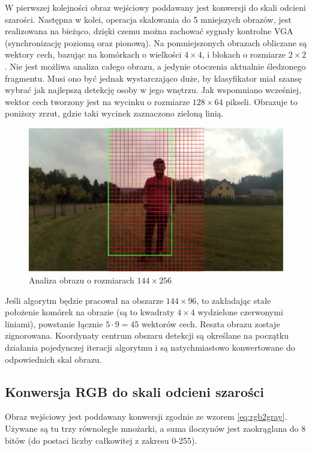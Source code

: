 W pierwszej kolejności obraz wejściowy poddawany jest konwersji do skali odcieni szarości. Następna w kolei, operacja skalowania do 5 mniejszych obrazów, jest realizowana na bieżąco, dzięki czemu można zachować sygnały kontrolne VGA (synchronizację poziomą oraz pionową). Na pomniejszonych obrazach obliczane są wektory cech, bazując na komórkach o wielkości $4\times 4$, i blokach o rozmiarze $2\times2$. Nie jest możliwa analiza całego obrazu, a jedynie otoczenia aktualnie śledzonego fragmentu. Musi ono być jednak wystarczająco duże, by klasyfikator miał szansę wybrać jak najlepszą detekcję osoby w jego wnętrzu. Jak wspomniano wcześniej, wektor cech tworzony jest na wycinku o rozmiarze $128\times 64$ pikseli. Obrazuje to poniższy zrzut, gdzie taki wycinek zaznaczono zieloną linią.
\begin{figure}[h]
	\centering
	\includegraphics[width=15cm]{4_scaled_hog_example.jpg}
	\caption{Analiza obrazu o rozmiarach $144\times 256$}
	\label{fig:HOG_mesh}
\end{figure}
\newline
Jeśli algorytm będzie pracował na obszarze $144\times 96$, to zakładając stałe położenie komórek na obrazie (są to kwadraty $4\times4$ wydzielone czerwonymi liniami), powstanie łącznie $5\cdot9=45$ wektorów cech. Reszta obrazu zostaje zignorowana. Koordynaty centrum obszaru detekcji są określane na początku działania pojedynczej iteracji algorytmu i są natychmiastowo konwertowane do odpowiednich skal obrazu.

\subsection{Konwersja RGB do skali odcieni szarości}
Obraz wejściowy jest poddawany konwersji zgodnie ze wzorem \ref{eq:rgb2gray}. Używane są tu trzy równoległe mnożarki, a suma iloczynów jest zaokrąglana do 8 bitów (do postaci liczby całkowitej z zakresu 0-255).

